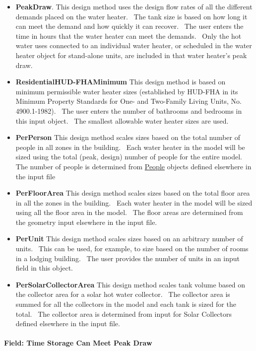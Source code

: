 \begin{itemize}
\item
  \textbf{PeakDraw}. This design method uses the design flow rates of all the different demands placed on the water heater.~ The tank size is based on how long it can meet the demand and how quickly it can recover.~ The user enters the time in hours that the water heater can meet the demands.~ Only the hot water uses connected to an individual water heater, or scheduled in the water heater object for stand-alone units, are included in that water heater's peak draw.
\item
  \textbf{ResidentialHUD-FHAMinimum} This design method is based on minimum permissible water heater sizes (established by HUD-FHA in its Minimum Property Standards for One- and Two-Family Living Units, No. 4900.1-1982).~ The user enters the number of bathrooms and bedrooms in this input object.~ The smallest allowable water heater sizes are used.
\item
  \textbf{PerPerson} This design method scales sizes based on the total number of people in all zones in the building.~ Each water heater in the model will be sized using the total (peak, design) number of people for the entire model.~ The number of people is determined from \hyperref[people]{People} objects defined elsewhere in the input file
\item
  \textbf{PerFloorArea} This design method scales sizes based on the total floor area in all the zones in the building.~ Each water heater in the model will be sized using all the floor area in the model.~ The floor areas are determined from the geometry input elsewhere in the input file.
\item
  \textbf{PerUnit} This design method scales sizes based on an arbitrary number of units.~ This can be used, for example, to size based on the number of rooms in a lodging building.~ The user provides the number of units in an input field in this object.
\item
  \textbf{PerSolarCollectorArea} This design method scales tank volume based on the collector area for a solar hot water collector.~ The collector area is summed for all the collectors in the model and each tank is sized for the total.~ The collector area is determined from input for Solar Collectors defined elsewhere in the input file.
\end{itemize}

\paragraph{Field: Time Storage Can Meet Peak Draw}\label{field-time-storage-can-meet-peak-draw}

